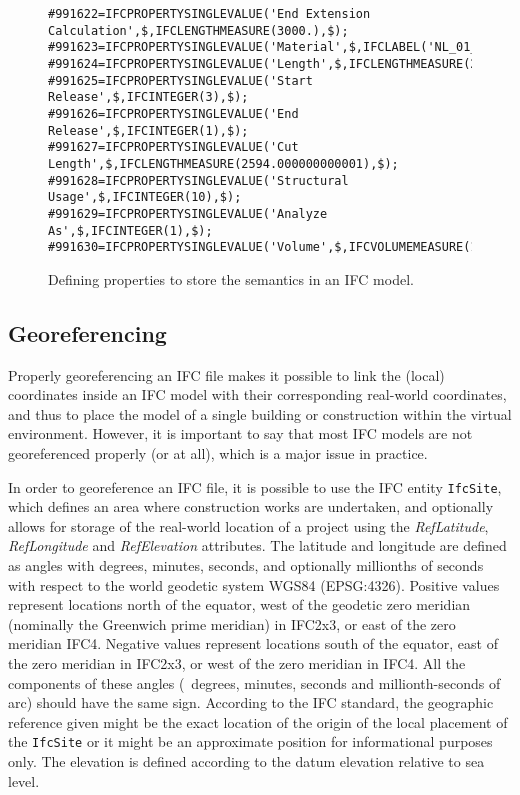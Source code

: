 \begin{figure}
\begin{lstlisting}[frame=single]
#991622=IFCPROPERTYSINGLEVALUE('End Extension Calculation',$,IFCLENGTHMEASURE(3000.),$);
#991623=IFCPROPERTYSINGLEVALUE('Material',$,IFCLABEL('NL_01_hout_plaat'),$);
#991624=IFCPROPERTYSINGLEVALUE('Length',$,IFCLENGTHMEASURE(2594.),$);
#991625=IFCPROPERTYSINGLEVALUE('Start Release',$,IFCINTEGER(3),$);
#991626=IFCPROPERTYSINGLEVALUE('End Release',$,IFCINTEGER(1),$);
#991627=IFCPROPERTYSINGLEVALUE('Cut Length',$,IFCLENGTHMEASURE(2594.000000000001),$);
#991628=IFCPROPERTYSINGLEVALUE('Structural Usage',$,IFCINTEGER(10),$);
#991629=IFCPROPERTYSINGLEVALUE('Analyze As',$,IFCINTEGER(1),$);
#991630=IFCPROPERTYSINGLEVALUE('Volume',$,IFCVOLUMEMEASURE(13602936.00000029),$);
\end{lstlisting}
\caption{Defining properties to store the semantics in an IFC model.}%
\label{fig:pset}
\end{figure}

\subsection{Georeferencing}

Properly georeferencing an IFC file makes it possible to link the (local) coordinates inside an IFC model with their corresponding real-world coordinates, and thus to place the model of a single building or construction within the virtual environment.
However, it is important to say that most IFC models are not georeferenced properly (or at all), which is a major issue in practice.

In order to georeference an IFC file, it is possible to use the IFC entity \texttt{IfcSite}, which defines an area where construction works are undertaken, and optionally allows for storage of the real-world location of a project using the \emph{RefLatitude}, \emph{RefLongitude} and \emph{RefElevation} attributes.
The latitude and longitude are defined as angles with degrees, minutes, seconds, and optionally millionths of seconds with respect to the world geodetic system WGS84 (EPSG:4326).
Positive values represent locations north of the equator, west of the geodetic zero meridian (nominally the Greenwich prime meridian) in IFC2x3, or east of the zero meridian IFC4.
Negative values represent locations south of the equator, east of the zero meridian in IFC2x3, or west of the zero meridian in IFC4.
All the components of these angles (\ie\ degrees, minutes, seconds and millionth-seconds of arc) should have the same sign.
According to the IFC standard, the geographic reference given might be the exact location of the origin of the local placement of the \texttt{IfcSite} or it might be an approximate position for informational purposes only.
The elevation is defined according to the datum elevation relative to sea level.

